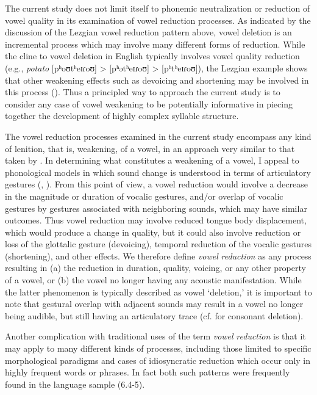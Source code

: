   The current study does not limit itself to phonemic neutralization or reduction of vowel quality in its examination of vowel reduction processes. As indicated by the discussion of the Lezgian vowel reduction pattern above, vowel deletion is an incremental process which may involve many different forms of reduction. While the cline to vowel deletion in English typically involves vowel quality reduction (e.g., \textit{potato} [pʰoʊtʰeɪɾoʊ] > [pʰətʰeɪɾoʊ] > [pʰtʰeɪɾoʊ]), the Lezgian example shows that other weakening effects such as devoicing and shortening may be involved in this process (\citealt{ChitoranBabaliyeva2007}). Thus a principled way to approach the current study is to consider any case of vowel weakening to be potentially informative in piecing together the development of highly complex syllable structure.



  The vowel reduction processes examined in the current study encompass any kind of lenition, that is, weakening, of a vowel, in an approach very similar to that taken by \citet{KapatsinskiEtAl2019}. In determining what constitutes a weakening of a vowel, I appeal to phonological models in which sound change is understood in terms of articulatory gestures (\citealt{BrowmanGoldstein1992b}, \citealt{MowreyPagliuca1995}). From this point of view, a vowel reduction would involve a decrease in the magnitude or duration of vocalic gestures, and/or overlap of vocalic gestures by gestures associated with neighboring sounds, which may have similar outcomes. Thus vowel reduction may involve reduced tongue body displacement, which would produce a change in quality, but it could also involve reduction or loss of the glottalic gesture (devoicing), temporal reduction of the vocalic gestures (shortening), and other effects. We therefore define \textit{vowel} \textit{reduction} as any process resulting in (a) the reduction in duration, quality, voicing, or any other property of a vowel, or (b) the vowel no longer having any acoustic manifestation. While the latter phenomenon is typically described as vowel ‘deletion,’ it is important to note that gestural overlap with adjacent sounds may result in a vowel no longer being audible, but still having an articulatory trace (cf. \citealt{BrowmanGoldstein1990} for consonant deletion).



  Another complication with traditional uses of the term \textit{vowel} \textit{reduction} is that it may apply to many different kinds of processes, including those limited to specific morphological paradigms and cases of idiosyncratic reduction which occur only in highly frequent words or phrases. In fact both such patterns were frequently found in the language sample (6.4-5).




